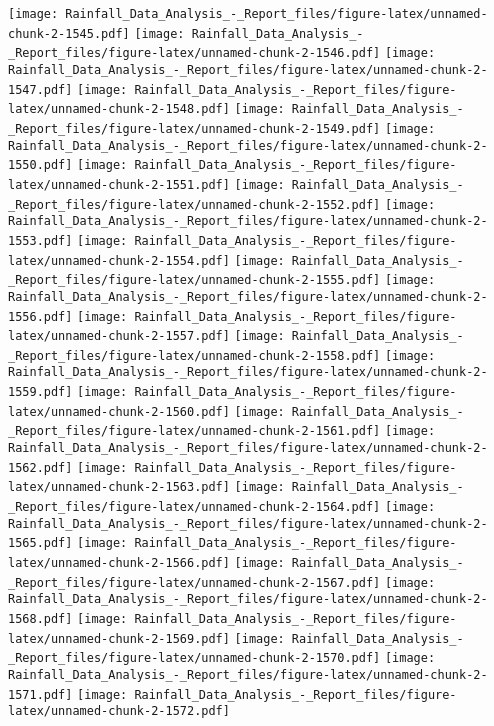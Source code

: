 \documentclass[
]{article}
\begin{document}
\texttt{[image: Rainfall\_Data\_Analysis\_-\_Report\_files/figure-latex/unnamed-chunk-2-1545.pdf]}
\texttt{[image: Rainfall\_Data\_Analysis\_-\_Report\_files/figure-latex/unnamed-chunk-2-1546.pdf]}
\texttt{[image: Rainfall\_Data\_Analysis\_-\_Report\_files/figure-latex/unnamed-chunk-2-1547.pdf]}
\texttt{[image: Rainfall\_Data\_Analysis\_-\_Report\_files/figure-latex/unnamed-chunk-2-1548.pdf]}
\texttt{[image: Rainfall\_Data\_Analysis\_-\_Report\_files/figure-latex/unnamed-chunk-2-1549.pdf]}
\texttt{[image: Rainfall\_Data\_Analysis\_-\_Report\_files/figure-latex/unnamed-chunk-2-1550.pdf]}
\texttt{[image: Rainfall\_Data\_Analysis\_-\_Report\_files/figure-latex/unnamed-chunk-2-1551.pdf]}
\texttt{[image: Rainfall\_Data\_Analysis\_-\_Report\_files/figure-latex/unnamed-chunk-2-1552.pdf]}
\texttt{[image: Rainfall\_Data\_Analysis\_-\_Report\_files/figure-latex/unnamed-chunk-2-1553.pdf]}
\texttt{[image: Rainfall\_Data\_Analysis\_-\_Report\_files/figure-latex/unnamed-chunk-2-1554.pdf]}
\texttt{[image: Rainfall\_Data\_Analysis\_-\_Report\_files/figure-latex/unnamed-chunk-2-1555.pdf]}
\texttt{[image: Rainfall\_Data\_Analysis\_-\_Report\_files/figure-latex/unnamed-chunk-2-1556.pdf]}
\texttt{[image: Rainfall\_Data\_Analysis\_-\_Report\_files/figure-latex/unnamed-chunk-2-1557.pdf]}
\texttt{[image: Rainfall\_Data\_Analysis\_-\_Report\_files/figure-latex/unnamed-chunk-2-1558.pdf]}
\texttt{[image: Rainfall\_Data\_Analysis\_-\_Report\_files/figure-latex/unnamed-chunk-2-1559.pdf]}
\texttt{[image: Rainfall\_Data\_Analysis\_-\_Report\_files/figure-latex/unnamed-chunk-2-1560.pdf]}
\texttt{[image: Rainfall\_Data\_Analysis\_-\_Report\_files/figure-latex/unnamed-chunk-2-1561.pdf]}
\texttt{[image: Rainfall\_Data\_Analysis\_-\_Report\_files/figure-latex/unnamed-chunk-2-1562.pdf]}
\texttt{[image: Rainfall\_Data\_Analysis\_-\_Report\_files/figure-latex/unnamed-chunk-2-1563.pdf]}
\texttt{[image: Rainfall\_Data\_Analysis\_-\_Report\_files/figure-latex/unnamed-chunk-2-1564.pdf]}
\texttt{[image: Rainfall\_Data\_Analysis\_-\_Report\_files/figure-latex/unnamed-chunk-2-1565.pdf]}
\texttt{[image: Rainfall\_Data\_Analysis\_-\_Report\_files/figure-latex/unnamed-chunk-2-1566.pdf]}
\texttt{[image: Rainfall\_Data\_Analysis\_-\_Report\_files/figure-latex/unnamed-chunk-2-1567.pdf]}
\texttt{[image: Rainfall\_Data\_Analysis\_-\_Report\_files/figure-latex/unnamed-chunk-2-1568.pdf]}
\texttt{[image: Rainfall\_Data\_Analysis\_-\_Report\_files/figure-latex/unnamed-chunk-2-1569.pdf]}
\texttt{[image: Rainfall\_Data\_Analysis\_-\_Report\_files/figure-latex/unnamed-chunk-2-1570.pdf]}
\texttt{[image: Rainfall\_Data\_Analysis\_-\_Report\_files/figure-latex/unnamed-chunk-2-1571.pdf]}
\texttt{[image: Rainfall\_Data\_Analysis\_-\_Report\_files/figure-latex/unnamed-chunk-2-1572.pdf]}
\end{document}
